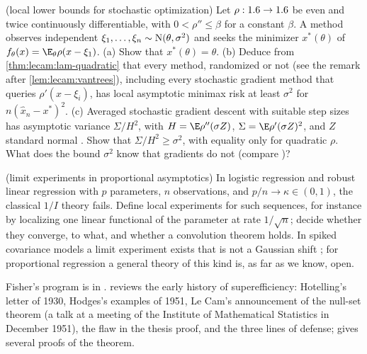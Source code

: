 \begin{refsection}
\begin{exercises}
\item \transfer\hard (local lower bounds for stochastic optimization) Let $\rho:1.6\to1.6$ be even and twice continuously differentiable, with $0<\rho''\le\beta$ for a constant $\beta$. A method observes independent $\xi_1,\dots,\xi_n\sim\mathrm{N}(\theta,\sigma^2)$ and seeks the minimizer $x^*(\theta)$ of $f_\theta(x)=\E_\theta\rho(x-\xi_1)$. (a) Show that $x^*(\theta)=\theta$. (b) Deduce from \cref{thm:lecam:lam-quadratic} that every method, randomized or not (see the remark after \cref{lem:lecam:vantrees}), including every stochastic gradient method that queries $\rho'(x-\xi_i)$, has local asymptotic minimax risk at least $\sigma^2$ for $n(\hat x_n-x^*)^2$. (c) Averaged stochastic gradient descent with suitable step sizes has asymptotic variance $\Sigma/H^2$, with $H=\E\rho''(\sigma Z)$, $\Sigma=\E\rho'(\sigma Z)^2$, and $Z$ standard normal \parencite{PolyakJuditsky1992}. Show that $\Sigma/H^2\ge\sigma^2$, with equality only for quadratic $\rho$. What does the bound $\sigma^2$ know that gradients do not (compare \textcite{DuchiRuan2021})? \label{ex:lecam:sgd}

\item \research\harder (limit experiments in proportional asymptotics) In logistic regression and robust linear regression with $p$ parameters, $n$ observations, and $p/n\to\kappa\in(0,1)$, the classical $1/I$ theory fails. Define local experiments for such sequences, for instance by localizing one linear functional of the parameter at rate $1/\sqrt n$; decide whether they converge, to what, and whether a convolution theorem holds. In spiked covariance models a limit experiment exists that is not a Gaussian shift \parencite{OnatskiMoreiraHallin2013}; for proportional regression a general theory of this kind is, as far as we know, open. \label{ex:lecam:proportional}
\end{exercises}

\notesandrefs
Fisher's program is in \textcite{Fisher1922,Fisher1925}. \textcite{Vovk2009} reviews the early history of superefficiency: Hotelling's letter of 1930, Hodges's examples of 1951, Le Cam's announcement of the null-set theorem (a talk at a meeting of the Institute of Mathematical Statistics in December 1951), the flaw in the thesis proof, and the three lines of defense; \textcite{vanderVaart1997} gives several proofs of the theorem.


\end{refsection}
